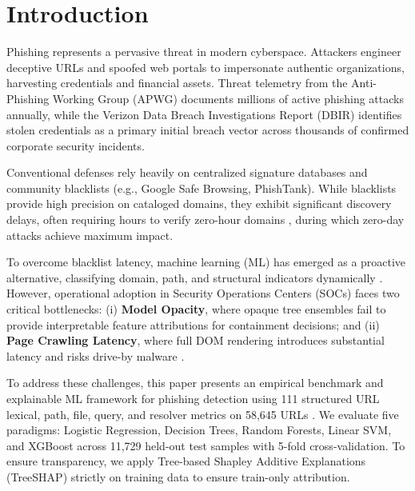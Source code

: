 \section{Introduction}
\label{sec:intro}

Phishing represents a pervasive threat in modern cyberspace. Attackers engineer deceptive URLs and spoofed web portals to impersonate authentic organizations, harvesting credentials and financial assets. Threat telemetry from the Anti-Phishing Working Group (APWG) \cite{apwg2023trends} documents millions of active phishing attacks annually, while the Verizon Data Breach Investigations Report (DBIR) \cite{verizon2024dbir} identifies stolen credentials as a primary initial breach vector across thousands of confirmed corporate security incidents.

Conventional defenses rely heavily on centralized signature databases and community blacklists (e.g., Google Safe Browsing, PhishTank). While blacklists provide high precision on cataloged domains, they exhibit significant discovery delays, often requiring hours to verify zero-hour domains \cite{sahoo2017malicious, rao2019detection, hannousse2021towards, marchal2017off}, during which zero-day attacks achieve maximum impact.

To overcome blacklist latency, machine learning (ML) has emerged as a proactive alternative, classifying domain, path, and structural indicators dynamically \cite{sahingoz2019machine, babagoli2019heuristic}. However, operational adoption in Security Operations Centers (SOCs) faces two critical bottlenecks: (i) \textbf{Model Opacity}, where opaque tree ensembles fail to provide interpretable feature attributions for containment decisions; and (ii) \textbf{Page Crawling Latency}, where full DOM rendering introduces substantial latency and risks drive-by malware \cite{opara2020htmlphish, adebowale2023intelligent}.

To address these challenges, this paper presents an empirical benchmark and explainable ML framework for phishing detection using 111 structured URL lexical, path, file, query, and resolver metrics on 58,645 URLs \cite{vrbancic2020datasets}. We evaluate five paradigms: Logistic Regression, Decision Trees, Random Forests, Linear SVM, and XGBoost across 11,729 held-out test samples with 5-fold cross-validation. To ensure transparency, we apply Tree-based Shapley Additive Explanations (TreeSHAP) \cite{lundberg2020local, lundberg2017unified} strictly on training data to ensure train-only attribution.

